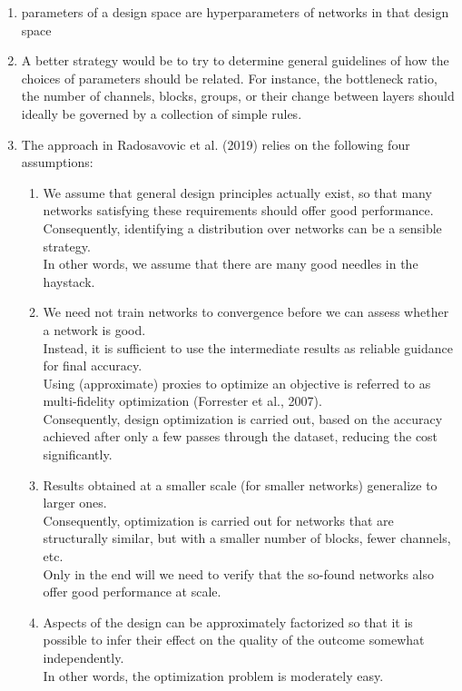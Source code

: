 \begin{enumerate}[itemsep=0.15cm]
    \item parameters of a design space are hyperparameters of networks in that design space

    \item A better strategy would be to try to determine general guidelines of how the choices of parameters should be related. For instance, the bottleneck ratio, the number of channels, blocks, groups, or their change between layers should ideally be governed by a collection of simple rules.

    \item The approach in Radosavovic et al. (2019) relies on the following four assumptions:
    \begin{enumerate}
        \item We assume that general design principles actually exist, so that many networks satisfying these requirements should offer good performance. \\
        Consequently, identifying a distribution over networks can be a sensible strategy. \\
        In other words, we assume that there are many good needles in the haystack.

        \item We need not train networks to convergence before we can assess whether a network is good.\\
        Instead, it is sufficient to use the intermediate results as reliable guidance for final accuracy.\\
        Using (approximate) proxies to optimize an objective is referred to as multi-fidelity optimization (Forrester et al., 2007).\\
        Consequently, design optimization is carried out, based on the accuracy achieved after only a few passes through the dataset, reducing the cost significantly.

        \item Results obtained at a smaller scale (for smaller networks) generalize to larger ones.\\
        Consequently, optimization is carried out for networks that are structurally similar, but with a smaller number of blocks, fewer channels, etc.\\
        Only in the end will we need to verify that the so-found networks also offer good performance at scale.

        \item Aspects of the design can be approximately factorized so that it is possible to infer their effect on the quality of the outcome somewhat independently. \\
        In other words, the optimization problem is moderately easy.


\end{enumerate}
\end{enumerate}
